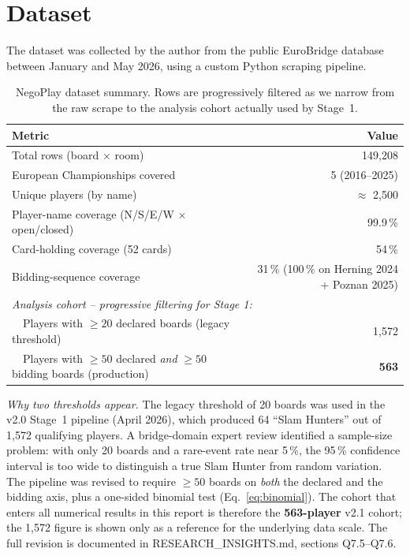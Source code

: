 \documentclass[11pt, a4paper, oneside, openany]{report}
\begin{document}
\section{Dataset}

The dataset was collected by the author from the public EuroBridge database between January and May 2026, using a custom Python scraping pipeline.

\begin{table}[H]
\centering\small
\caption{NegoPlay dataset summary. Rows are progressively filtered as we narrow from the raw scrape to the analysis cohort actually used by Stage~1.}
\label{tab:dataset}
\begin{tabular}{lr}
\toprule
\textbf{Metric} & \textbf{Value} \\
\midrule
Total rows (board $\times$ room) & 149{,}208 \\
European Championships covered & 5 (2016--2025) \\
Unique players (by name)        & $\approx$ 2{,}500 \\
Player-name coverage (N/S/E/W $\times$ open/closed) & 99.9\,\% \\
Card-holding coverage (52 cards)                    & 54\,\% \\
Bidding-sequence coverage                            & 31\,\% (100\,\% on Herning 2024 + Poznan 2025) \\
\midrule
\multicolumn{2}{l}{\textit{Analysis cohort -- progressive filtering for Stage 1:}} \\
~~Players with $\geq 20$ declared boards (legacy threshold) & 1{,}572 \\
~~Players with $\geq 50$ declared \emph{and} $\geq 50$ bidding boards (production) & \textbf{563} \\
\bottomrule
\end{tabular}
\end{table}

\textit{Why two thresholds appear.} The legacy threshold of 20 boards was used in
the v2.0 Stage~1 pipeline (April 2026), which produced 64 ``Slam Hunters''
out of 1{,}572 qualifying players. A bridge-domain expert review
identified a sample-size problem: with only 20 boards and a rare-event rate
near 5\,\%, the 95\,\% confidence interval is too wide to distinguish a true
Slam Hunter from random variation. The pipeline was revised to require
$\geq 50$ boards on \emph{both} the declared and the bidding axis, plus a
one-sided binomial test (Eq.~\eqref{eq:binomial}). The cohort that enters
all numerical results in this report is therefore the \textbf{563-player}
v2.1 cohort; the 1{,}572 figure is shown only as a reference for the
underlying data scale. The full revision is documented in
RESEARCH\_INSIGHTS.md, sections Q7.5--Q7.6.
\end{document}
